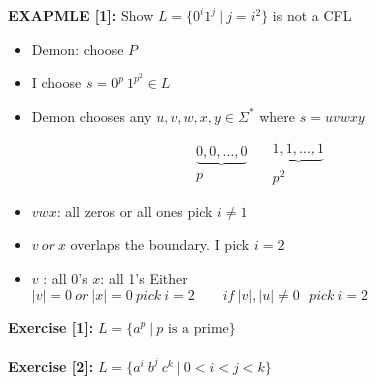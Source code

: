 \documentclass[11pt]{article}
\begin{document}
\textbf{EXAPMLE [1]:} Show $L = \{ 0^i 1^j\ |\ j = i^2 \}$ is not a CFL
\begin{itemize}
	\item Demon: choose $P$
	\item I choose $s = 0^p\ 1^{p^2}  \in L$
	\item Demon chooses any $ u,v,w,x,y \in \Sigma^*$ where $s=uvwxy$
\end{itemize}
$$ \begin{matrix} \underbrace{ 0, 0, \ldots, 0 } \\ p \end{matrix} \quad \begin{matrix} \underbrace{ 1, 1, \ldots, 1 } \\ p^2 \end{matrix}$$
\begin{itemize}
	\item $vwx$: all zeros or all ones \quad pick $i \neq 1$
	\item $v\ or \ x$ overlaps the boundary. I pick $i = 2$
	\item $v$ : all 0's \quad $x$: all 1's 
	Either $|v| = 0 \ or \ |x| = 0 \ pick\ i = 2 \quad\quad if\ |v|, |u|\neq 0 \ \ \ pick\ i = 2$
\end{itemize}
\newpage
\textbf{Exercise [1]:} $L = \{ a^p \ |\ p \text{ is a prime} \}$
\\
\\
\textbf{Exercise [2]:} $L = \{ a^i\ b^j\ c^k \ |\ 0 < i < j < k \}$
\end{document}
